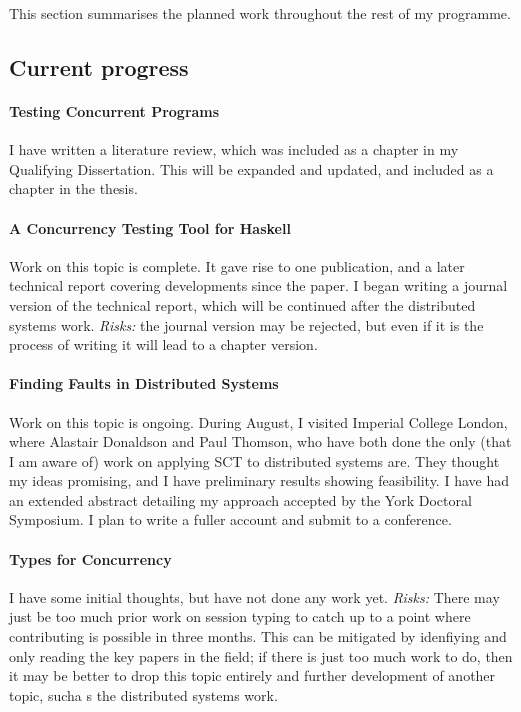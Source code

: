\documentclass{article}
\begin{document}
This section summarises the planned work throughout the rest of my
programme.

\subsection{Current progress}

\paragraph{Testing Concurrent Programs} I have written a literature
review, which was included as a chapter in my Qualifying Dissertation.
This will be expanded and updated, and included as a chapter in the
thesis.

\paragraph{A Concurrency Testing Tool for Haskell} Work on this topic
is complete. It gave rise to one publication\cite{walker2015}, and a
later technical report\cite{YCS-2016-503} covering developments since
the paper. I began writing a journal version of the technical report,
which will be continued after the distributed systems
work. \emph{Risks:} the journal version may be rejected, but even if
it is the process of writing it will lead to a chapter version.

\paragraph{Finding Faults in Distributed Systems} Work on this topic
is ongoing. During August, I visited Imperial College London, where
Alastair Donaldson and Paul Thomson, who have both done the only (that
I am aware of) work on applying SCT to distributed
systems\cite{deligiannis2015,deligiannis2016} are. They thought my
ideas promising, and I have preliminary results showing feasibility. I
have had an extended abstract detailing my approach accepted by the
York Doctoral Symposium. I plan to write a fuller account and submit
to a conference.

\paragraph{Types for Concurrency} I have some initial thoughts, but
have not done any work yet. \emph{Risks:} There may just be too much
prior work on session typing to catch up to a point where contributing
is possible in three months. This can be mitigated by idenfiying and
only reading the key papers in the field; if there is just too much
work to do, then it may be better to drop this topic entirely and
further development of another topic, sucha s the distributed systems
work.
\end{document}
